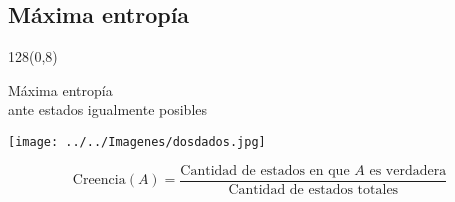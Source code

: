 \documentclass[shownotes]{beamer}
\begin{document}
\begin{frame}
{}
\centering

 
 



\end{frame}

 \subsection{M\'axima entrop\'ia}
  \begin{frame}
 \begin{textblock}{128}(0,8)
 \begin{center}
 \large M\'axima entrop\'ia \\ 
 \normalsize ante estados igualmente posibles
 \end{center}
 \end{textblock}
\vspace{-1cm}
 
 \begin{center}
\texttt{[image: ../../Imagenes/dosdados.jpg]}
 \end{center}
 
  \pause
 
 \vspace{0.5cm}
 
 \begin{equation*}
  \text{Creencia}(A) = \frac{\text{Cantidad de estados en que $A$ es verdadera}}{\text{Cantidad de estados totales}}
 \end{equation*}
 
 \end{frame}
\end{document}
